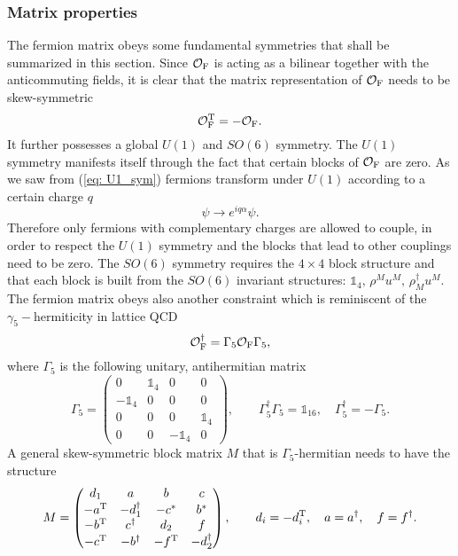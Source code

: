 \subsubsection{Matrix properties} \label{sec: matrix_prop}
The fermion matrix obeys some fundamental symmetries that shall be summarized in this section. Since $\mathcal{O}_{\rm F}$ is acting as a bilinear together with the anticommuting  fields, it is clear that the matrix representation of $\mathcal{O}_{\rm F}$ needs to be skew-symmetric
%
%
\begin{equation}
\mathcal{O}_{\rm F}^{\rm T} = -\mathcal{O}_{\rm F}.
\label{eq: skew_sym}
\end{equation}
%
%
It further possesses a global $U(1)$ and $SO(6)$ symmetry. The $U(1)$ symmetry manifests itself through the fact that certain blocks of $\mathcal{O}_{\rm F}$ are zero. As we saw from (\ref{eq: U1_sym}) fermions transform under $U(1)$ according to a certain charge $q$
%
%
\begin{equation}
\psi \to e^{iq\alpha}\psi.
\end{equation}
%
%
Therefore only fermions with complementary charges are allowed to couple, in order to respect the $U(1)$ symmetry and the blocks that lead to other couplings need to be zero. The $SO(6)$ symmetry requires the $4\times 4$ block structure and that each block is built from the $SO(6)$ invariant structures: $\mathds{1}_{4},\,\rho^{M}u^{M},\,\rho_{M}^{\dagger}u^{M}$. The fermion matrix obeys also another constraint which is reminiscent of the $\gamma_{5}-$hermiticity in lattice QCD \cite{montvay_lattice}
%
%
\begin{equation}
\mathcal{O}_{\rm F}^{\dagger} = \Gamma_{5}\mathcal{O}_{\rm F}\Gamma_{5},
\label{eq: G5_sym}
\end{equation}
%
%
where $\Gamma_{5}$ is the following unitary, antihermitian matrix
%
%
\begin{equation}
\Gamma_{5} = \begin{pmatrix}
0 & \mathds{1}_{4} & 0 & 0 \\ 
 -\mathds{1}_{4}& 0 & 0 & 0 \\ 
0 & 0 & 0 & \mathds{1}_{4} \\ 
0 & 0 & -\mathds{1}_{4} & 0
\end{pmatrix} ,\qquad
\Gamma_{5}^{\dagger}\Gamma_{5}= \mathds{1}_{16}, \quad \Gamma_{5}^{\dagger} = -\Gamma_{5}.
\end{equation}
%
%
A general skew-symmetric block matrix $M$ that is $\Gamma_{5}$-hermitian needs to have the structure
%
%
\begin{equation}
M=\begin{pmatrix}
d_{1} & a & b & c \\ 
-a^{\rm T} & -d_{1}^{\dagger} & -c^{*} & b^{*} \\ 
-b^{\rm T} & c^{\dagger} & d_{2} & f \\ 
-c^{\rm T} & -b^{\dagger} & -f^{\rm T} & -d_{2}^{\dagger}
\end{pmatrix} ,\qquad d_{i}=-d_{i}^{\rm T},\quad a=a^{\dagger}, \quad f=f^{\dagger}.
\label{eq: G5_herm_mat}
\end{equation}
